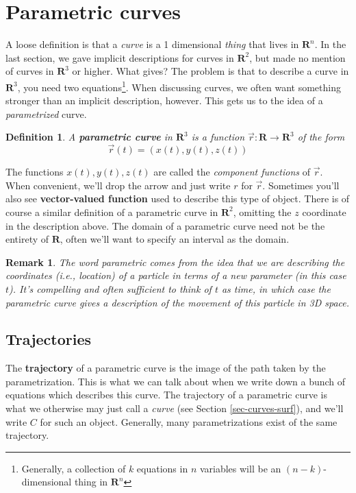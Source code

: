 \documentclass[12pt]{article}
\numberwithin{equation}{subsection}
\numberwithin{figure}{subsection}
\newtheorem{defn}[subsection]{Definition}
\theoremstyle{note}
\newtheorem{remark}[subsection]{Remark}
\begin{document}
{\section{Parametric curves}
\label{sec-param}

A loose definition is that a \textit{curve} is a 1 dimensional \textit{thing} that lives in $\mathbf{R}^n$. In the last section, we gave implicit descriptions for curves in $\mathbf{R}^2$, but made no mention of curves in $\mathbf{R}^3$ or higher. What gives? The problem is that to describe a curve in $\mathbf{R}^3$, you need two equations\footnote{Generally, a collection of $k$ equations in $n$ variables will be an $(n-k)$-dimensional thing in $\mathbf{R}^n$}. When discussing curves, we often want something stronger than an implicit description, however. This gets us to the idea of a \textit{parametrized} curve. 

\begin{defn} A \textbf{parametric curve} in $\mathbf{R}^3$ is a function $\vec{r}\colon \mathbf{R}\to \mathbf{R}^3$ of the form \begin{equation} \vec{r}(t)=(x(t),y(t),z(t)) \end{equation}  \end{defn} 
The functions $x(t),y(t),z(t)$ are called the \textit{component functions} of $\vec{r}$. When convenient, we'll drop the arrow and just write $r$ for $\vec{r}$. Sometimes you'll also see \textbf{vector-valued function} used to describe this type of object. There is of course a similar definition of a parametric curve in $\mathbf{R}^2$, omitting the $z$ coordinate in the description above. The domain of a parametric curve need not be the entirety of $\mathbf{R}$, often we'll want to specify an interval as the domain. 

\begin{remark}The word \textit{parametric} comes from the idea that we are describing the coordinates (i.e., location) of a particle in terms of a new \textit{parameter} (in this case $t$). It's compelling and often sufficient to think of $t$ as time, in which case the parametric curve gives a description of the movement of this particle in 3D space. \end{remark}

\subsection{Trajectories}
The \textbf{trajectory} of a parametric curve is the image of the path taken by the parametrization. This is what we can talk about when we write down a bunch of equations which describes this curve. The trajectory of a parametric curve is what we otherwise may just call a \textit{curve} (see Section \ref{sec-curves-surf}), and we'll write $C$ for such an object. Generally, many parametrizations exist of the same trajectory. 


}
\end{document}
